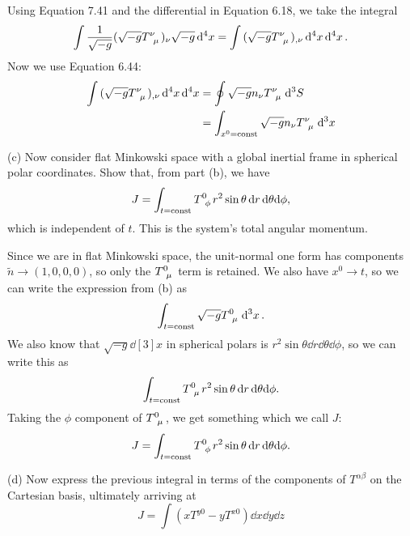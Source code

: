\documentclass[gr-notes.tex]{subfiles}
\begin{document}
Using Equation 7.41 and the differential in Equation 6.18, we take the integral
%
\begin{displaymath}
  \int {
    \frac{1}{\sqrt{-g}} (\sqrt{-g} \tensor{T}{^\nu_\mu})_\nu \sqrt{-g}
  } \dd[4]{x} =
  \int {
    (\sqrt{-g} \tensor{T}{^\nu_\mu})_{,\nu} \dd[4]{x}
  } \dd[4]{x}.
\end{displaymath}
%
Now we use Equation 6.44:
%
\begin{align*}
  \int {
    (\sqrt{-g} \tensor{T}{^\nu_\mu})_{,\nu} \dd[4]{x}
  } \dd[4]{x} &=
  \oint {
    \sqrt{-g} n_\nu \tensor{T}{^\nu_\mu}
  } \dd[3]{S}
  \\ &=
  \int_{x^0 = \mathrm{const}} \sqrt{-g} n_\nu \tensor{T}{^\nu_\mu} \dd[3]{x}
\end{align*}

(c) Now consider flat Minkowski space with a global inertial frame in spherical polar coordinates. Show that, from part (b), we have
%
\begin{displaymath}
  J =
  \int_{t=\mathrm{const}} {
    \tensor{T}{^0_\phi} r^2 \sin\theta
  } \dd{r} \dd\theta \dd\phi,
\end{displaymath}
%
which is independent of $t$. This is the system's total angular momentum.

Since we are in flat Minkowski space, the unit-normal one form has components $\tilde{n} \to (1, 0, 0, 0)$, so only the $\tensor{T}{^0_\mu}$ term is retained. We also have $x^0 \to t$, so we can write the expression from (b) as
%
\begin{displaymath}
  \int_{t = \mathrm{const}} \sqrt{-g} \tensor{T}{^0_\mu} \dd[3]{x}.
\end{displaymath}
%
We also know that $\sqrt{-g} \dd[3]{x}$ in spherical polars is $r^2 \sin\theta \dd{r} \dd\theta \dd\phi$, so we can write this as
%
\begin{displaymath}
  \int_{t = \mathrm{const}} {
    \tensor{T}{^0_\mu} r^2 \sin\theta
  } \dd{r} \dd\theta \dd\phi.
\end{displaymath}
%
Taking the $\phi$ component of $\tensor{T}{^0_\mu}$, we get something which we call $J$:
%
\begin{displaymath}
  J =
  \int_{t = \mathrm{const}} {
    \tensor{T}{^0_\phi} r^2 \sin\theta
  } \dd{r} \dd\theta \dd\phi.
\end{displaymath}

(d) Now express the previous integral in terms of the components of $T^{\alpha\beta}$ on the Cartesian basis, ultimately arriving at
%
\begin{displaymath}
  J =
  \int {
    (x T^{y0} - y T^{x0})
  } \dd{x} \dd{y} \dd{z}
\end{displaymath}
\end{document}
